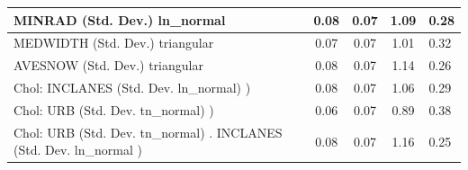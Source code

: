 \begin{table}
\begin{center}
\begin{tabular}{|l|l|c|c|c|l|}
			\hline
			MINRAD (Std. Dev.) ln_normal &  & 0.08 & 0.07 & 1.09 & 0.28 \\
			\hline
			MEDWIDTH (Std. Dev.) triangular &  & 0.07 & 0.07 & 1.01 & 0.32 \\
			\hline
			AVESNOW (Std. Dev.) triangular &  & 0.08 & 0.07 & 1.14 & 0.26 \\
			\hline
			 Chol: INCLANES (Std. Dev. ln_normal) ) &  & 0.08 & 0.07 & 1.06 & 0.29 \\
			\hline
			 Chol: URB (Std. Dev. tn_normal) ) &  & 0.06 & 0.07 & 0.89 & 0.38 \\
			\hline
			 Chol: URB (Std. Dev. tn_normal) . INCLANES (Std. Dev.   ln_normal ) &  & 0.08 & 0.07 & 1.16 & 0.25 \\
			\hline
		\end{tabular}
	\end{center}
\end{table}